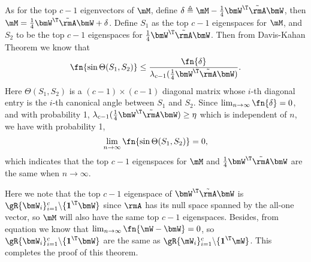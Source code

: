 As for the top $c-1$ eigenvectors of $\mM$, define $\delta\triangleq\mM-\frac14\bmW^\T\tilde{\rmA}\bmW$, then $\mM = \frac14\bmW^\T\tilde{\rmA}\bmW + \delta$. Define $S_1$ as the top $c-1$ eigenspaces for $\mM$, and $S_2$ to be the top $c-1$ eigenspaces for $\frac14\bmW^\T\tilde{\rmA}\bmW$. Then from Davis-Kahan Theorem we know that
\begin{equation}
    \fn{\sin\Theta(S_1,S_2)}\leq\frac{\fn{\delta}}{\lambda_{c-1}(\frac14\bmW^\T\tilde{\rmA}\bmW)}.
\end{equation}
Here $\Theta(S_1,S_2)$ is a $(c-1)\times(c-1)$ diagonal matrix whose $i$-th diagonal entry is the $i$-th canonical angle between $S_1$ and $S_2$. Since $\lim_{n\to\infty}\fn{\delta}=0$, and with probability 1, $\lambda_{c-1}(\frac14\bmW^\T\tilde{\rmA}\bmW)\geq\eta$ which is independent of $n$, we have with probability 1,
\begin{equation}
    \lim_{n\to\infty}\fn{\sin\Theta(S_1,S_2)} = 0,
\end{equation}
which indicates that the top $c-1$ eigenspaces for $\mM$ and $\frac14\bmW^\T\tilde{\rmA}\bmW$ are the same when $n\to\infty$.

Here we note that the top $c-1$ eigenspace of $\bmW^\T\tilde{\rmA}\bmW$ is $\gR\{\bmW_i\}_{i=1}^c\backslash\{\textbf{1}^\T\bmW\}$ since $\rmA$ has its null space spanned by the all-one vector, so $\mM$ will also have the same top $c-1$ eigenspaces. Besides, from equation  we know that $\lim_{n\to\infty}\fn{\mW-\bmW}=0$, so $\gR\{\bmW_i\}_{i=1}^c\backslash\{\textbf{1}^\T\bmW\}$ are the same as $\gR\{\mW_i\}_{i=1}^c\backslash\{\textbf{1}^\T\mW\}$. This completes the proof of this theorem.
